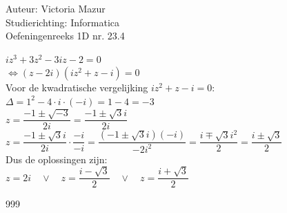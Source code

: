 \documentclass[a4paper]{article}
\begin{document}
  
\noindent \large Auteur: Victoria Mazur \\
\noindent \large Studierichting: Informatica\\
\noindent \large Oefeningenreeks 1D nr. 23.4\\

\medskip

\normalsize

$iz^3 + 3z^2 - 3iz - 2 = 0$ \\

$\Leftrightarrow (z - 2i)(iz^2 + z - i) = 0$ \\

Voor de kwadratische vergelijking $iz^2 + z - i = 0$: \\

$\Delta = 1^2 - 4 \cdot i \cdot (-i) = 1 - 4 = -3$ \\

$z = \dfrac{-1 \pm \sqrt{-3}}{2i} = \dfrac{-1 \pm \sqrt{3}i}{2i}$ \\

$z = \dfrac{-1 \pm \sqrt{3}i}{2i} \cdot \dfrac{-i}{-i} = \dfrac{(-1 \pm \sqrt{3}i)(-i)}{-2i^2} = \dfrac{i \mp \sqrt{3}i^2}{2} = \dfrac{i \pm \sqrt{3}}{2}$ \\

Dus de oplossingen zijn: \\

$z = 2i \quad \vee \quad z = \dfrac{i - \sqrt{3}}{2} \quad \vee \quad z = \dfrac{i + \sqrt{3}}{2}$ \\

\begin{thebibliography}{999}
\end{thebibliography}
\end{document}
